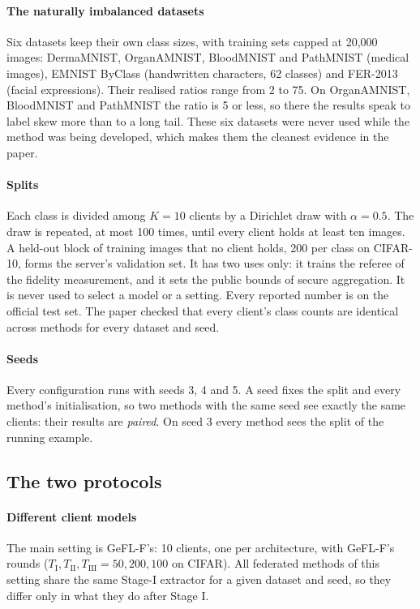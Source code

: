 \paragraph{The naturally imbalanced datasets} Six datasets keep their own class sizes, with training sets capped at
20,000 images: DermaMNIST, OrganAMNIST, BloodMNIST and PathMNIST (medical images), EMNIST ByClass (handwritten
characters, 62 classes) and FER-2013 (facial expressions). Their realised ratios range from 2 to 75. On OrganAMNIST,
BloodMNIST and PathMNIST the ratio is 5 or less, so there the results speak to label skew more than to a long tail.
These six datasets were never used while the method was being developed, which makes them the cleanest evidence in
the paper.

\paragraph{Splits} Each class is divided among $K=10$ clients by a Dirichlet draw with $\alpha=0.5$. The draw is
repeated, at most 100 times, until every client holds at least ten images. A held-out block of training images that
no client holds, 200 per class on CIFAR-10, forms the server's validation set. It has two uses only: it trains the
referee of the fidelity measurement, and it sets the public bounds of secure aggregation. It is never used to select a
model or a setting. Every reported number is on the official test set. The paper checked that every client's class
counts are identical across methods for every dataset and seed.

\paragraph{Seeds} Every configuration runs with seeds 3, 4 and 5. A seed fixes the split and every method's
initialisation, so two methods with the same seed see exactly the same clients: their results are \emph{paired}. On seed 3 every
method sees the split of the running example.

\subsection{The two protocols}

\paragraph{Different client models} The main setting is GeFL-F's: 10 clients, one per architecture, with GeFL-F's
rounds ($T_{\mathrm I},T_{\mathrm{II}},T_{\mathrm{III}}=50,200,100$ on CIFAR). All federated methods of this setting
share the same Stage-I extractor for a given dataset and seed, so they differ only in what they do after Stage I.

